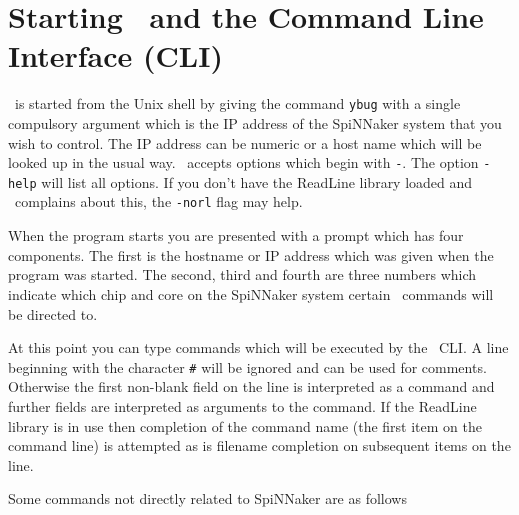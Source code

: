 \section{Starting \ybug\ and the Command Line Interface (CLI)}

\ybug\ is started from the Unix shell by giving the command \texttt{ybug}
with a single compulsory argument which is the IP address of the
SpiNNaker system that you wish to control. The IP address can be
numeric or a host name which will be looked up in the usual way. \ybug\
accepts options which begin with \texttt{-}. The option \texttt{-help}
will list all options. If you don't have the ReadLine library loaded
and \ybug\ complains about this, the \texttt{-norl} flag may help.

When the program starts you are presented with a prompt which has four
components. The first is the hostname or IP address which was given
when the program was started. The second, third and fourth are three
numbers which indicate which chip and core on the SpiNNaker system
certain \ybug\ commands will be directed to.

At this point you can type commands which will be executed by
the \ybug\ CLI. A line beginning with the character \texttt{\#} will
be ignored and can be used for comments. Otherwise the first non-blank
field on the line is interpreted as a command and further fields are
interpreted as arguments to the command. If the ReadLine library is in
use then completion of the command name (the first item on the command
line) is attempted as is filename completion on subsequent items on the
line.

Some commands not directly related to SpiNNaker are as follows

